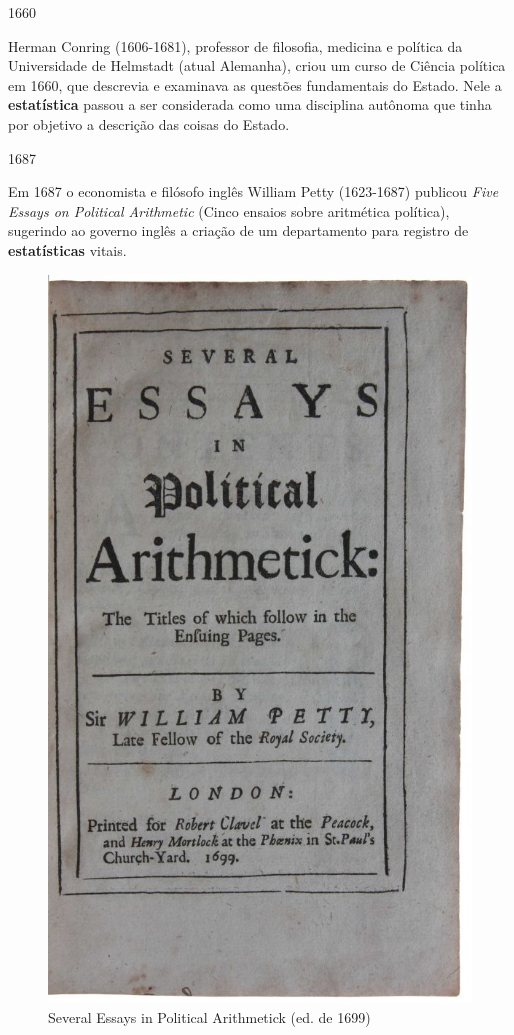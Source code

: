 \documentclass[
]{book}
\begin{document}
\hfill\break

1660

\hfill\break

Herman Conring (1606-1681), professor de filosofia, medicina e política da Universidade de Helmstadt (atual Alemanha), criou um curso de Ciência política em 1660, que descrevia e examinava as questões fundamentais do Estado. Nele a \textbf{estatística} passou a ser considerada como uma disciplina autônoma que tinha por objetivo a descrição das coisas do Estado.

\hfill\break

1687

\hfill\break

Em 1687 o economista e filósofo inglês William Petty (1623-1687) publicou \emph{Five Essays on Political Arithmetic} (Cinco ensaios sobre aritmética política), sugerindo ao governo inglês a criação de um departamento para registro de \textbf{estatísticas} vitais.

\hfill\break

\begin{figure}

{\centering \includegraphics[width=0.75\linewidth]{images1/petty} 

}

\caption{Several Essays in Political Arithmetick (ed. de 1699)}\label{fig:unnamed-chunk-5}
\end{figure}
\end{document}
